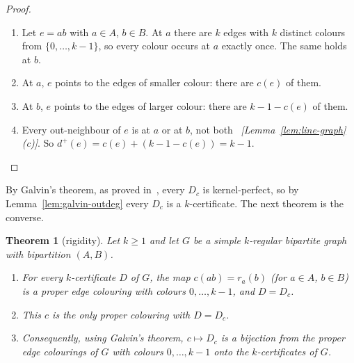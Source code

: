 \documentclass[11pt]{article}
\theoremstyle{plain}
\newtheorem{theorem}{Theorem}[section]
\theoremstyle{definition}
\theoremstyle{remark}
\newcommand{\dout}{d^{+}}
\newcommand{\why}[1]{\unskip\ \textit{[#1]}}
\newenvironment{steps}{\begin{enumerate}[label=(\arabic*),leftmargin=2.2em,itemsep=0.35em]}{\end{enumerate}}
\begin{document}
\begin{proof}
\begin{steps}
  \item Let $e=ab$ with $a\in A$, $b\in B$. At $a$ there are $k$ edges with $k$ distinct colours
    from $\{0,\dots,k-1\}$, so every colour occurs at $a$ exactly once. The same holds at $b$.
  \item At $a$, $e$ points to the edges of smaller colour: there are $c(e)$ of them.
  \item At $b$, $e$ points to the edges of larger colour: there are $k-1-c(e)$ of them.
  \item Every out-neighbour of $e$ is at $a$ or at $b$, not both
    \why{Lemma~\ref{lem:line-graph}(c)}. So $\dout(e)=c(e)+(k-1-c(e))=k-1$. \qedhere
\end{steps}
\end{proof}

By Galvin's theorem, as proved in~\cite{galvin}, every $D_c$ is kernel-perfect, so by
Lemma~\ref{lem:galvin-outdeg} every $D_c$ is a $k$-certificate. The next theorem is the
converse.

\begin{theorem}[rigidity]\label{thm:rigid}
Let $k\ge 1$ and let $G$ be a simple $k$-regular bipartite graph with bipartition $(A,B)$.
\begin{enumerate}[label=(\alph*)]
  \item For every $k$-certificate $D$ of $G$, the map $c(ab)=r_a(b)$ (for $a\in A$, $b\in B$) is
    a proper edge colouring with colours $0,\dots,k-1$, and $D=D_c$.
  \item This $c$ is the only proper colouring with $D=D_c$.
  \item Consequently, using Galvin's theorem, $c\mapsto D_c$ is a bijection from the proper edge
    colourings of $G$ with colours $0,\dots,k-1$ onto the $k$-certificates of $G$.
\end{enumerate}
\end{theorem}
\end{document}
